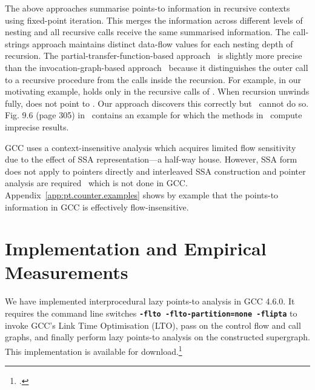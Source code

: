 \documentclass{llncs}
\newcommand{\pt}[2]{\text{}}
\begin{document}
The above approaches summarise points-to information in recursive contexts
using fixed-point iteration.
This merges the information across different levels
of nesting and all recursive calls receive the same summarised
information.
The call-strings approach maintains distinct data-flow values for
each nesting depth of recursion. 
The partial-transfer-function-based approach~\cite{Wilson.RP.Lam.MS:1995:Efficient-Context-Sensitive-Pointer}
is slightly more precise than the invocation-graph-based 
approach~\cite{Emami.M.Ghiya.R.Hendren.LJ:1994:Context-sensitive-interprocedural-points-to}
because it distinguishes the outer call to a recursive procedure
from the calls inside the recursion. For example, in our motivating
example, \pt{z}{x} holds only in the recursive calls of .
When recursion unwinds fully,  does not point to . Our approach
discovers this correctly but~\cite{Emami.M.Ghiya.R.Hendren.LJ:1994:Context-sensitive-interprocedural-points-to}
cannot do so. Fig. 9.6 (page 305) in~\cite{Khedker.U.Sanyal.A.Karkare.B:2009:Data-Flow-Analysis}
contains an example for which the methods 
in~\cite{Wilson.RP.Lam.MS:1995:Efficient-Context-Sensitive-Pointer,Emami.M.Ghiya.R.Hendren.LJ:1994:Context-sensitive-interprocedural-points-to}
compute imprecise results.

GCC uses a context-insensitive analysis which acquires limited
flow sensitivity due to the effect of SSA representation---a half-way house.
However, SSA form does not apply to 
pointers directly and interleaved SSA construction and pointer analysis
are required~\cite{Hasti.R.Horwitz.S:1998:Using-static-single} which is not
done in GCC\@.
Appendix~\ref{app:pt.counter.examples} shows by example that
the points-to information in GCC is effectively flow-insensitive.




\section{Implementation and Empirical Measurements}
\label{sec:measurements}

We have implemented interprocedural lazy points-to analysis in GCC 4.6.0.
It requires the command line switches 
{\tt\bfseries -flto -flto-partition=none -flipta}
to invoke GCC's Link Time Optimisation (LTO), pass on the control
flow and call graphs, and finally perform lazy points-to analysis on
the constructed supergraph. This implementation 
is available for download.\footnote{.}
\end{document}
